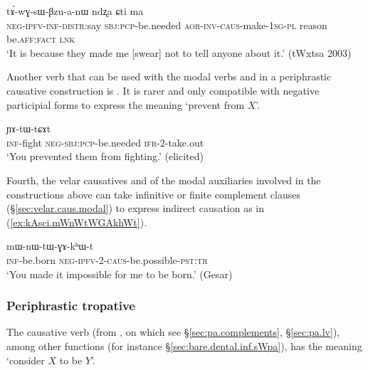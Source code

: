  \begin{exe}
\ex  \label{ex:kWra.tAwGsWBzuanW}
\gll [mɯ-tu-kɤ-nɤtɯti kɯ-ra] tɤ́-wɣ-sɯ-βzu-a-nɯ ndʐa ɕti ma  \\
\textsc{neg}-\textsc{ipfv}-\textsc{inf}-\textsc{distr}:say \textsc{sbj}:\textsc{pcp}-be.needed \textsc{aor}-\textsc{inv}-\textsc{caus}-make-\textsc{1sg}-\textsc{pl} reason be.\textsc{aff}:\textsc{fact} \textsc{lnk} \\ 
\glt `It is because they made me [swear] not to tell anyone about it.'  (tWxtsa 2003)
\end{exe}

Another verb that can be used with the modal verbs  and  in a periphrastic causative construction is . It is rarer and only compatible with negative participial forms to express the meaning `prevent from $X$'.

\begin{exe}
\ex  \label{ex:mAkWra.YAtWtCAt}
\gll  [kɤ-ɤlɯlɤt mɤ-kɯ-ra] ɲɤ-tɯ-tɕɤt \\
\textsc{inf}-fight \textsc{neg}-\textsc{sbj}:\textsc{pcp}-be.needed \textsc{ifr}-2-take.out \\
\glt `You prevented them from fighting.' (elicited)
\end{exe}
 
 Fourth, the velar causatives   and   of the modal auxiliaries involved in the constructions above can take infinitive or finite complement clauses (§\ref{sec:velar.caus.modal}) to express indirect causation as in (\ref{ex:kAsci.mWnWtWGAkhWt}).

\begin{exe}
\ex \label{ex:kAsci.mWnWtWGAkhWt}
\gll   [kɤ-sci] mɯ-nɯ-tɯ-ɣɤ-kʰɯ-t  \\
\textsc{inf}-be.born \textsc{neg}-\textsc{ipfv}-2-\textsc{caus}-be.possible-\textsc{pst}:\textsc{tr} \\
\glt `You made it impossible for me to be born.' (Gesar)
\end{exe}  

\subsubsection{Periphrastic tropative} \label{sec:tropative.sWpa}
The causative verb  (from , on which see
§\ref{sec:pa.complements}, §\ref{sec:pa.lv}), among other functions (for instance §\ref{sec:bare.dental.inf.sWpa}), has the meaning `consider $X$ to be $Y$'.

